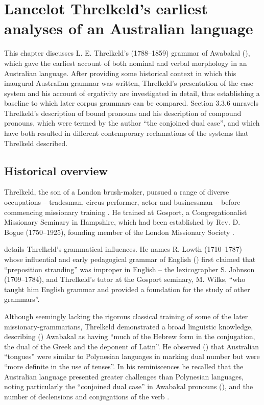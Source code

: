\chapter{Lancelot Threlkeld’s earliest analyses of an Australian language}
\label{chap:key:3}

This chapter discusses L. E. Threlkeld’s (1788--1859) grammar of Awabakal (\citeyear{threlkeld_australian_1834}), which gave the earliest account of both nominal and verbal morphology in an Australian language. After providing some historical context in which this inaugural Australian grammar was written, Threlkeld’s presentation of the case system and his account of ergativity are investigated in detail, thus establishing a baseline to which later corpus grammars can be compared. Section 3.3.6 unravels Threlkeld’s description of bound pronouns and his description of compound pronouns, which were termed by the author ``the conjoined dual case'', and which have both resulted in different contemporary reclamations of the systems that Threlkeld described.

\section{Historical overview}
\label{sec:key:3.1}

Threlkeld, the son of a London brush-maker, pursued a range of diverse occupations -- tradesman, circus performer, actor and businessman -- before commencing missionary training \citep{gunson_australian_2016-1}. He trained at Gosport, a Congregationalist Missionary Seminary in Hampshire, which had been established by Rev. D. Bogue (1750--1925), founding member of the London Missionary Society \citep[291]{Champion1939}.

\citet[165]{newton_more_1987} details Threlkeld’s grammatical influences. He names R. Lowth (1710--1787) – whose influential and early pedagogical grammar of English (\citealt{lowth_short_1762}) first claimed that “preposition stranding” was improper in English – the lexicographer S. Johnson (1709--1784), and Threlkeld’s tutor at the Gosport seminary, M. Wilks, “who taught him English grammar and provided a foundation for the study of other grammars”. 

Although seemingly lacking the rigorous classical training of some of the later missionary-grammarians, Threlkeld demonstrated a broad linguistic knowledge, describing (\citeyear[x]{threlkeld_australian_1834}) Awabakal as having “much of the Hebrew form in the conjugation, the dual of the Greek and the deponent of Latin”. He observed (\citeyear[vi]{threlkeld_australian_1834}) that Australian “tongues” were similar to Polynesian languages in marking dual number but were “more definite in the use of tenses”. In his reminiscences he recalled that the Australian language presented greater challenges than Polynesian languages, noting particularly the “conjoined dual case” in Awabakal pronouns (), and the number of declensions and conjugations of the verb \citep[42]{threlkeld_notitle_1974}.

